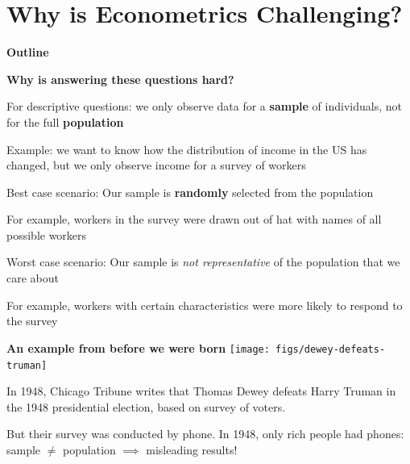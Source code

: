 \documentclass[11pt, aspectratio=169]{beamer}
\newenvironment{wideitemize}{\itemize\addtolength{\itemsep}{5pt}}{\enditemize}
\begin{document}
\section{Why is Econometrics Challenging?}
	\begin{frame}{\bf \large Outline}
	\tableofcontents[currentsection]
\end{frame}
\begin{frame}{\bf \large Why is answering these questions hard?}

\begin{wideitemize}
\item
For descriptive questions: we only observe data for a \textbf{sample} of individuals, not for the full \textbf{population}
	\begin{wideitemize}
		\item 
		Example: we want to know how the distribution of income in the US has changed, but we only observe income for a survey of workers
	\end{wideitemize}
\pause

\item Best case scenario: Our sample is \textbf{randomly} selected from the population \\
	\begin{wideitemize}
		\item 
		For example, workers in the survey were drawn out of hat with names of all possible workers

	\end{wideitemize}

\pause 

\item Worst case scenario: Our sample is \textit{not representative} of the population that we care about
	\begin{wideitemize}
		\item For example, workers with certain characteristics were more likely to respond to the survey
	\end{wideitemize}
\end{wideitemize}

\end{frame}


\begin{frame}{\bf \large An example from before we were born }
\centering
\texttt{[image: figs/dewey-defeats-truman]}
\begin{wideitemize}
	\item 
	In 1948, Chicago Tribune writes that Thomas Dewey defeats Harry Truman in the 1948 presidential election, based on survey of voters.
	
	\pause
	\item
	But their survey was conducted by phone. In 1948, only rich people had phones: sample $\neq$ population $\implies$ misleading results! 
\end{wideitemize}
\end{frame}
\end{document}
